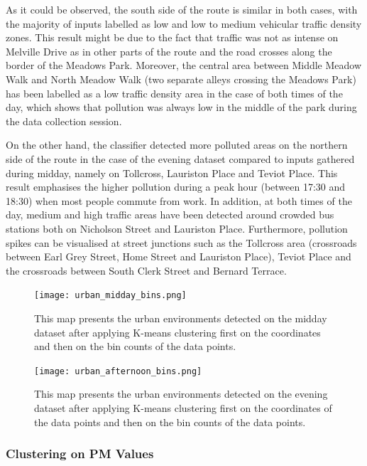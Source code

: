 \documentclass[bsc,frontabs,twoside,singlespacing, parskip,deptreport]{infthesis}     %
\begin{document}
As it could be observed, the south side of the route is similar in both cases, with the majority of inputs labelled as low and low to medium vehicular traffic density zones. This result might be due to the fact that traffic was not as intense on Melville Drive as in other parts of the route and the road crosses along the border of the Meadows Park. Moreover, the central area between Middle Meadow Walk and North Meadow Walk (two separate alleys crossing the Meadows Park) has been labelled as a low traffic density area in the case of both times of the day, which shows that pollution was always low in the middle of the park during the data collection session.

On the other hand, the classifier detected more polluted areas on the northern side of the route in the case of the evening dataset compared to inputs gathered during midday, namely on Tollcross, Lauriston Place and Teviot Place. This result emphasises the higher pollution during a peak hour (between 17:30 and 18:30) when most people commute from work. In addition, at both times of the day, medium and high traffic areas have been detected around crowded bus stations both on Nicholson Street and Lauriston Place. Furthermore, pollution spikes can be visualised at street junctions such as the Tollcross area (crossroads between Earl Grey Street, Home Street and Lauriston Place), Teviot Place and the crossroads between South Clerk Street and Bernard Terrace.


\begin{figure}[h!]
  \center
  \texttt{[image: urban\_midday\_bins.png]}
  \caption{This map presents the urban environments detected on the midday dataset after applying K-means clustering first on the coordinates and then on the bin counts of the data points.}
  \label{fig:urban_midday_bins}
\end{figure}

\begin{figure}[h!]
  \center
  \texttt{[image: urban\_afternoon\_bins.png]}
  \caption{This map presents the urban environments detected on the evening dataset after applying K-means clustering first on the coordinates of the data points and then on the bin counts of the data points.}
  \label{fig:urban_afternoon_bins}
\end{figure}

\subsubsection*{Clustering on PM Values}
\end{document}
